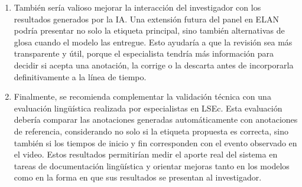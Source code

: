 \begin{enumerate}
    \item También sería valioso mejorar la interacción del investigador con los resultados generados por la IA. Una extensión futura del panel en ELAN podría presentar no solo la etiqueta principal, sino también alternativas de glosa cuando el modelo las entregue. Esto ayudaría a que la revisión sea más transparente y útil, porque el especialista tendría más información para decidir si acepta una anotación, la corrige o la descarta antes de incorporarla definitivamente a la línea de tiempo.

    \item Finalmente, se recomienda complementar la validación técnica con una evaluación lingüística realizada por especialistas en LSEc. Esta evaluación debería comparar las anotaciones generadas automáticamente con anotaciones de referencia, considerando no solo si la etiqueta propuesta es correcta, sino también si los tiempos de inicio y fin corresponden con el evento observado en el video. Estos resultados permitirían medir el aporte real del sistema en tareas de documentación lingüística y orientar mejoras tanto en los modelos como en la forma en que sus resultados se presentan al investigador.
\end{enumerate}
